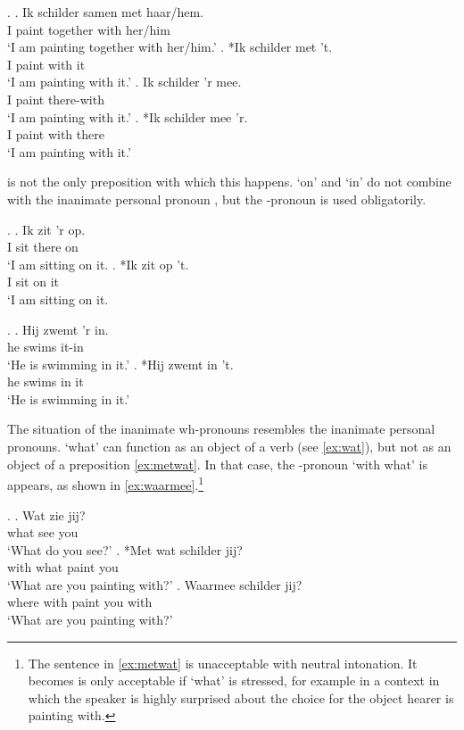 \documentclass[12pt]{article}
\begin{document}
\ex. \label{ex:objprep}
\ag. Ik schilder samen met haar/hem.\\
 I paint together with her/him\\
 `I am painting together with her/him.'\label{ex:prepani}
\bg. *Ik schilder met 't.\\
 I paint with it\\
 `I am painting with it.'\label{ex:prephet}
\bg. Ik schilder 'r mee.\\
 I paint there-with\\
 `I am painting with it.'\label{ex:preper}
\bg. *Ik schilder mee 'r.\\
 I paint with there\\
 `I am painting with it.'\label{ex:erprep}

 is not the only preposition with which this happens.  `on' and  `in' do not combine with the inanimate personal pronoun , but the -pronoun is used obligatorily.

\ex.
\ag. Ik zit 'r op.\\
 I sit there on\\
 `I am sitting on it.
\bg. *Ik zit op 't.\\
 I sit on it\\
 `I am sitting on it.

\ex.
 \ag. Hij zwemt 'r in.\\
  he swims it-in\\
  `He is swimming in it.'
 \bg. *Hij zwemt in 't.\\
  he swims in it\\
  `He is swimming in it.'

The situation of the inanimate wh-pronouns resembles the inanimate personal pronouns.  `what' can function as an object of a verb (see \ref{ex:wat}), but not as an object of a preposition \ref{ex:metwat}. In that case, the -pronoun  `with what' is appears, as shown in \ref{ex:waarmee}.\footnote{The sentence in \ref{ex:metwat} is unacceptable with neutral intonation. It becomes is only acceptable if  `what' is stressed, for example in a context in which the speaker is highly surprised about the choice for the object hearer is painting with.}

\ex.
\ag. Wat zie jij?\\
 what see you\\
 `What do you see?'\label{ex:wat}
\bg. *Met wat schilder jij?\\
 with what paint you\\
 `What are you painting with?'\label{ex:metwat}
\bg. Waarmee schilder jij?\\
 {where with} paint you with\\
 `What are you painting with?'\label{ex:waarmee}
\end{document}
